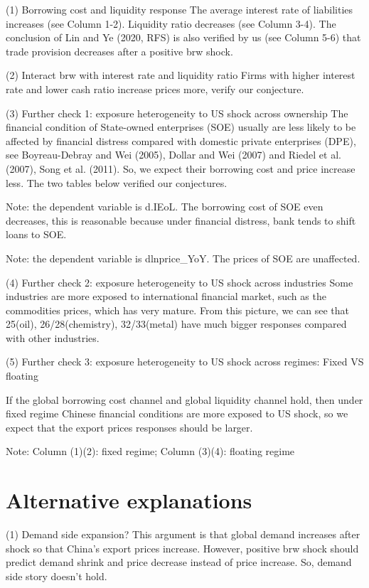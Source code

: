 \documentclass[12pt]{article}
\begin{document}
(1) Borrowing cost and liquidity response
The average interest rate of liabilities increases (see Column 1-2). Liquidity ratio decreases (see Column 3-4). The conclusion of Lin and Ye (2020, RFS) is also verified by us (see Column 5-6) that trade provision decreases after a positive brw shock.

 

(2) Interact brw with interest rate and liquidity ratio
Firms with higher interest rate and lower cash ratio increase prices more, verify our conjecture. 
 


(3) Further check 1: exposure heterogeneity to US shock across ownership
The financial condition of State-owned enterprises (SOE) usually are less likely to be affected by financial distress compared with domestic private enterprises (DPE), see Boyreau-Debray and Wei (2005), Dollar and Wei (2007) and Riedel et al. (2007), Song et al. (2011). So, we expect their borrowing cost and price increase less.  The two tables below verified our conjectures.

 
Note: the dependent variable is d.IEoL. The borrowing cost of SOE even decreases, this is reasonable because under financial distress, bank tends to shift loans to SOE.

 
Note: the dependent variable is dlnprice_YoY. The prices of SOE are unaffected.


(4) Further check 2: exposure heterogeneity to US shock across industries
Some industries are more exposed to international financial market, such as the commodities prices, which has very mature. From this picture, we can see that 25(oil), 26/28(chemistry), 32/33(metal) have much bigger responses compared with other industries.

 

(5) Further check 3: exposure heterogeneity to US shock across regimes: Fixed VS floating

If the global borrowing cost channel and global liquidity channel hold, then under fixed regime Chinese financial conditions are more exposed to US shock, so we expect that the export prices responses should be larger. 

 
Note: Column (1)(2): fixed regime; Column (3)(4): floating regime

\section{Alternative explanations}

(1) Demand side expansion?
This argument is that global demand increases after shock so that China’s export prices increase. However, positive brw shock should predict demand shrink and price decrease instead of price increase. So, demand side story doesn’t hold.
\end{document}
